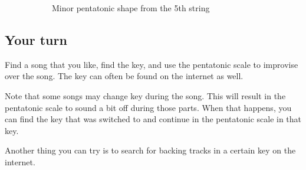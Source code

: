 \begin{figure}[h]
\begin{subfigure}[b]{0.45\textwidth}
		\caption{Minor pentatonic shape from the 5th string}
		\label{fig:guitar_minor_pentatonic_shape_start_5th_string}
	\end{subfigure}
	\caption{}
	\label{fig:guitar_major_minor_pentatonic_shapes}
\end{figure}

\subsection{Your turn}

Find a song that you like, find the key, and use the pentatonic scale to improvise over the song. The key can often be found on the internet as well.

Note that some songs may change key during the song. This will result in the pentatonic scale to sound a bit off during those parts. When that happens, you can find the key that was switched to and continue in the pentatonic scale in that key.

Another thing you can try is to search for backing tracks in a certain key on the internet.